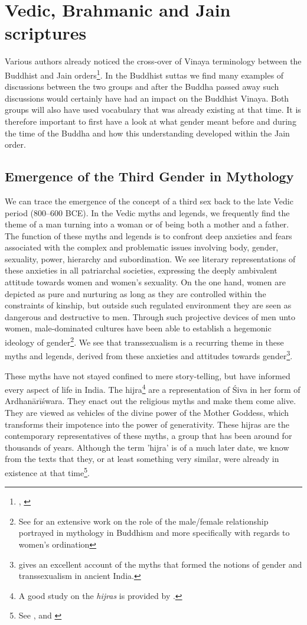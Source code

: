 \section{Vedic, Brahmanic and Jain scriptures}

Various authors already noticed the cross-over of Vinaya terminology between the Buddhist and Jain orders\footnote{\cite{sujato2009}, \cite{zwilling}}. In the Buddhist suttas we find many examples of discussions between the two groups and after the Buddha passed away such discussions would certainly have had an impact on the Buddhist Vinaya. Both groups will also have used vocabulary that was already existing at that time. It is therefore important to first have a look at what gender meant before and during the time of the Buddha and how this understanding developed within the Jain order.

\subsection{Emergence of the Third Gender in Mythology}
We can trace the emergence of the concept of a third sex back to the late Vedic period (800–600 BCE). In the Vedic myths and legends, we frequently find the theme of a man turning into a woman or of being both a mother and a father. The function of these myths and legends is to confront deep anxieties and fears associated with the complex and problematic issues involving body, gender, sexuality, power, hierarchy and subordination. We see literary representations of these anxieties in all patriarchal societies, expressing the deeply ambivalent attitude towards women and women's sexuality. On the one hand, women are depicted as pure and nurturing as long as they are controlled within the constraints of kinship, but outside such regulated environment they are seen as dangerous and destructive to men. Through such projective devices of men unto women, male-dominated cultures have been able to establish a hegemonic ideology of gender\footnote{See \cite{sujato2011} for an extensive work on the role of the male/female relationship portrayed in mythology in Buddhism and more specifically with regards to women's ordination}. We see that transsexualism is a recurring theme in these myths and legends, derived from these anxieties and attitudes towards gender\footnote{\cite{goldman} gives an excellent account of the myths that formed the notions of gender and transsexualism in ancient India.}.

These myths have not stayed confined to mere story-telling, but have informed every aspect of life in India. The hijra\footnote{A good study on the {\em hijras} is provided by \cite{nanda}.} are a representation of Śiva in her form of Ardhanārīśwara. They enact out the religious myths and make them come alive. They are viewed as vehicles of the divine power of the Mother Goddess, which transforms their impotence into the power of generativity. These hijras are the contemporary representatives of these myths, a group that has been around for thousands of years. Although the term 'hijra' is of a much later date, we know from the texts that they, or at least something very similar, were already in existence at that time\footnote{See \cite{zwilling}, \cite{goldman} and \cite{wendy}}.

